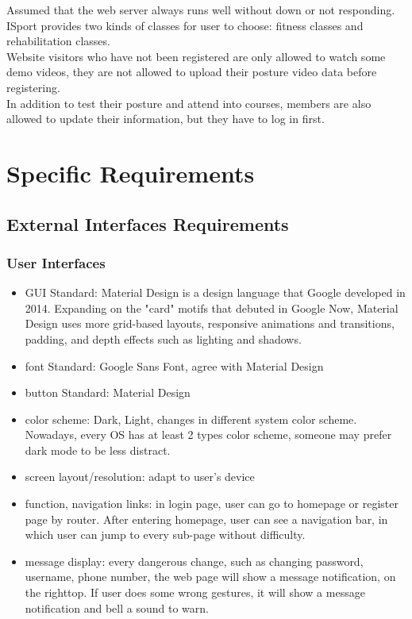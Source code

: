 \documentclass[16pt]{scrreprt}
\begin{document}
 
Assumed that the web server always runs well without down or not responding.\\

 
ISport provides two kinds of classes for user to choose: fitness classes and rehabilitation classes.\\

 
Website visitors who have not been registered are only allowed to watch some demo videos, they are not allowed to upload their posture video data before registering.\\

 
In addition to test their posture and attend into courses, members are also allowed to update their information, but they have to log in first.\\


\chapter{Specific Requirements}
\label{Specific Requirements}
\section{External Interfaces Requirements}
\subsection{User Interfaces}
\begin{itemize}
    \item GUI Standard: Material Design is a design language that Google developed in 2014. Expanding on the "card" motifs that debuted in Google Now, Material Design uses more grid-based layouts, responsive animations and transitions, padding, and depth effects such as lighting and shadows.
    \item font Standard: Google Sans Font, agree with Material Design
    \item button Standard: Material Design
    \item color scheme: Dark, Light, changes in different system color scheme. Nowadays, every OS has at least 2 types color scheme, someone may prefer dark mode to be less distract.
    \item screen layout/resolution: adapt to user's device
    \item function, navigation links: in login page, user can go to homepage or register page by router. After entering homepage, user can see a navigation bar, in which user can jump to every sub-page without difficulty.
    \item message display: every dangerous change, such as changing password, username, phone number, the web page will show a message notification, on the righttop. If user does some wrong gestures, it will show a message notification and bell a sound to warn.
\end{itemize}
\end{document}
